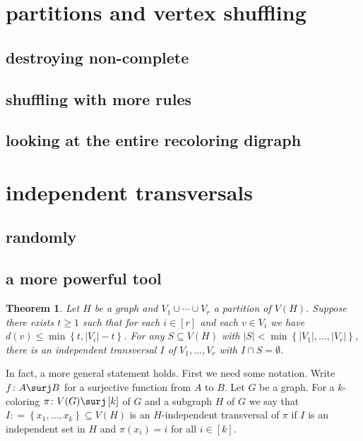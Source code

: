 \documentclass{amsbook}
\theoremstyle{plain}
\newtheorem{theorem}{Theorem}
\numberwithin{equation}{chapter}
\newcommand{\set}[1]{\left\{ #1 \right\}}
\newcommand{\card}[1]{\left|#1\right|}
\newcommand{\funcsurj}[3]{#1\colon #2 \surj #3}
\newcommand{\irange}[1]{\left[#1\right]}
\newcommand{\DefinedAs}{\mathrel{\mathop:}=}
\begin{document}
\chapter*{partitions and vertex shuffling}
\section*{destroying non-complete}
\section*{shuffling with more rules}
\section*{looking at the entire recoloring digraph}

\chapter*{independent transversals}
\section*{randomly}
\section*{a more powerful tool}
\begin{theorem}\label{LopsidedTransversal}
Let $H$ be a graph and $V_1 \cup \cdots \cup V_r$ a partition of $V(H)$.  
Suppose there exists $t \geq 1$ such that for each $i \in \irange{r}$ and each $v \in V_i$ we have $d(v) \leq \min\set{t, \card{V_i}-t}$.  For any $S \subseteq V(H)$ with $\card{S} < \min\set{\card{V_1}, \ldots, \card{V_r}}$, there is an independent transversal $I$ of $V_1, \ldots, V_r$ with $I \cap S = \emptyset$.
\end{theorem}

In fact, a more general statement holds. 
First we need some notation. 
Write $\funcsurj{f}{A}{B}$ for a surjective function from $A$ to $B$.  
Let $G$ be a graph.  
For a $k$-coloring $\funcsurj{\pi}{V(G)}{\irange{k}}$ of $G$ and a subgraph $H$ of $G$ we say 
that $I \DefinedAs \set{x_1, \ldots, x_k} \subseteq V(H)$ is an $H$-independent transversal of $\pi$ if $I$ is an independent 
set in $H$ and $\pi(x_i) = i$ for all $i \in \irange{k}$.
\end{document}
